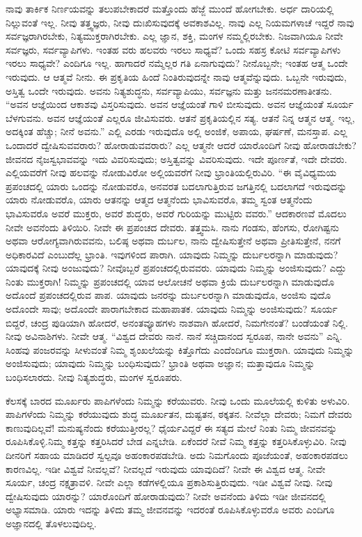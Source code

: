 ನಾವು ತಾರ್ಕಿಕ ನಿರ್ಣಯವನ್ನು ತಲುಪಬೇಕಾದರೆ ಮತ್ತೊಂದು ಹೆಜ್ಜೆ ಮುಂದೆ ಹೋಗಬೇಕು. ಅರ್ಧ ದಾರಿಯಲ್ಲಿ ನಿಲ್ಲುವಂತೆ ಇಲ್ಲ. ನೀವು ತತ್ತ್ವಜ್ಞರು, ನೀವು ದುಃಖಿಸುವುದಕ್ಕೆ ಅವಕಾಶವಿಲ್ಲ. ನಾವು ಎಲ್ಲ ನಿಯಮಗಳಾಚೆ ಇದ್ದರೆ ನಾವು ಸರ್ವಜ್ಞರಾಗಿರಬೇಕು, ನಿತ್ಯಮುಕ್ತರಾಗಿರಬೇಕು. ಎಲ್ಲ ಜ್ಞಾನ, ಶಕ್ತಿ, ಮಂಗಳ ನಮ್ಮಲ್ಲಿರಬೇಕು. ನಿಜವಾಗಿಯೂ ನೀವೇ ಸರ್ವಜ್ಞರು, ಸರ್ವವ್ಯಾಪಿಗಳು. ಇಂತಹ ವರು ಹಲವರು ಇರಲು ಸಾಧ್ಯವೆ? ಒಂದು ಸಹಸ್ರ ಕೋಟಿ ಸರ್ವವ್ಯಾಪಿಗಳು ಇರಲು ಸಾಧ್ಯವೇ? ಎಂದಿಗೂ ಇಲ್ಲ. ಹಾಗಾದರೆ ನಮ್ಮೆಲ್ಲರ ಗತಿ ಏನಾಗುವುದು? ನೀನೊಬ್ಬನೇ; ಇಂತಹ ಆತ್ಮ ಒಂದೇ ಇರುವುದು. ಆ ಆತ್ಮವೆ ನೀನು. ಈ ಪ್ರಕೃತಿಯ ಹಿಂದೆ ನಿಂತಿರುವುದನ್ನೇ ನಾವು ಆತ್ಮವೆನ್ನುವುದು. ಒಬ್ಬನೇ ಇರುವುದು, ಅಸ್ತಿತ್ವ ಒಂದೇ ಇರುವುದು. ಅವನು ನಿತ್ಯಶುದ್ಧನು, ಸರ್ವವ್ಯಾಪಿಯು, ಸರ್ವಜ್ಞನು ಮತ್ತು ಜನನಮರಣಾತೀತನು. “ಅವನ ಆಜ್ಞೆಯಿಂದ ಆಕಾಶವು ವಿಸ್ತರಿಸುವುದು. ಅವನ ಆಜ್ಞೆಯಂತೆ ಗಾಳಿ ಬೀಸುವುದು. ಅವನ ಆಜ್ಞೆಯಂತೆ ಸೂರ್ಯ ಬೆಳಗುವನು. ಅವನ ಆಜ್ಞೆಯಂತೆ ಎಲ್ಲರೂ ಜೀವಿಸುವರು. ಆತನೆ ಪ್ರಕೃತಿಯಲ್ಲಿನ ಸತ್ಯ. ಆತನೆ ನಿನ್ನ ಆತ್ಮನ ಆತ್ಮ. ಇಲ್ಲ, ಅದಕ್ಕಿಂತ ಹೆಚ್ಚು; ನೀನೆ ಅವನು.” ಎಲ್ಲಿ ಎರಡು ಇರುವುದೊ ಅಲ್ಲಿ ಅಂಜಿಕೆ, ಅಪಾಯ, ಘರ್ಷಣೆ, ಮನಸ್ತಾಪ. ಎಲ್ಲ ಒಂದಾದರೆ ದ್ವೇಷಿಸುವವರಾರು? ಹೋರಾಡುವವರಾರು? ಎಲ್ಲ ಆತ್ಮನೇ ಆದರೆ ಯಾರೊಂದಿಗೆ ನೀವು ಹೋರಾಡಬೇಕು? ಜೀವನದ ನೈಜಸ್ವಭಾವವನ್ನು ಇದು ವಿವರಿಸುವುದು; ಅಸ್ತಿತ್ವವನ್ನು ವಿವರಿಸುವುದು. ಇದೇ ಪೂರ್ಣತೆ, ಇದೇ ದೇವರು. ಎಲ್ಲಿಯವರೆಗೆ ನೀವು ಹಲವನ್ನು ನೋಡುವಿರೋ ಅಲ್ಲಿಯವರೆಗೆ ನೀವು ಭ್ರಾಂತಿಯಲ್ಲಿರುವಿರಿ. “ಈ ವೈವಿಧ್ಯಮಯ ಪ್ರಪಂಚದಲ್ಲಿ ಯಾರು ಒಂದನ್ನು ನೋಡುವರೊ, ಅನವರತ ಬದಲಾಗುತ್ತಿರುವ ಜಗತ್ತಿನಲ್ಲಿ ಬದಲಾಗದೆ ಇರುವುದನ್ನು ಯಾರು ನೋಡುವರೊ, ಯಾರು ಆತನನ್ನು ಆತ್ಮದ ಆತ್ಮನೆಂದು ಭಾವಿಸುವರೊ, ತಮ್ಮ ಸ್ವಂತ ಆತ್ಮನೆಂದು ಭಾವಿಸುವರೊ ಅವರೆ ಮುಕ್ತರು, ಅವರೆ ಶುದ್ಧರು, ಅವರೆ ಗುರಿಯನ್ನು ಮುಟ್ಟಿರು ವವರು.” ಆದಕಾರಣವೆ ಮೊದಲು ನೀವೇ ಅವನೆಂದು ತಿಳಿಯಿರಿ. ನೀವೇ ಈ ಪ್ರಪಂಚದ ದೇವರು. ತತ್ತ್ವಮಸಿ. ನಾನು ಗಂಡಸು, ಹೆಂಗಸು, ರೋಗಿಷ್ಟನು ಅಥವಾ ಆರೋಗ್ಯವಾಗಿರುವವನು, ಬಲಿಷ್ಠ ಅಥವಾ ದುರ್ಬಲ, ನಾನು ದ್ವೇಷಿಸುತ್ತೇನೆ ಅಥವಾ ಪ್ರೀತಿಸುತ್ತೇನೆ, ನನಗೆ ಅಧಿಕಾರವಿದೆ ಎಂಬುದೆಲ್ಲ ಭ್ರಾಂತಿ. ಇವುಗಳಿಂದ ಪಾರಾಗಿ. ಯಾವುದು ನಿಮ್ಮನ್ನು ದುರ್ಬಲರನ್ನಾಗಿ ಮಾಡುವುದು? ಯಾವುದಕ್ಕೆ ನೀವು ಅಂಜುವುದು? ನೀವೊಬ್ಬರೆ ಪ್ರಪಂಚದಲ್ಲಿರುವವರು. ಯಾವುದು ನಿಮ್ಮನ್ನು ಅಂಜಿಸುವುದು? ಎದ್ದು ನಿಂತು ಮುಕ್ತರಾಗಿ! ನಿಮ್ಮನ್ನು ಪ್ರಪಂಚದಲ್ಲಿ ಯಾವ ಆಲೋಚನೆ ಅಥವಾ ಕ್ರಿಯೆ ದುರ್ಬಲರನ್ನಾಗಿ ಮಾಡುವುದೊ ಅದೊಂದೆ ಪ್ರಪಂಚದಲ್ಲಿರುವ ಪಾಪ. ಯಾವುದು ಜನರನ್ನು ದುರ್ಬಲರನ್ನಾಗಿ ಮಾಡುವುದೊ, ಅಂಜಿಸು ವುದೊ ಅದೊಂದೇ ಸಾವು; ಅದೊಂದೇ ಪಾರಾಗಬೇಕಾದ ಮಹಾಪಾತಕ. ಯಾವುದು ನಿಮ್ಮನ್ನು ಅಂಜಿಸುವುದು? ಸೂರ್ಯ ಬಿದ್ದರೆ, ಚಂದ್ರ ಪುಡಿಯಾಗಿ ಹೋದರೆ, ಅನಂತವ್ಯೂಹಗಳು ನಾಶವಾಗಿ ಹೋದರೆ, ನಿಮಗೇನಂತೆ? ಬಂಡೆಯಂತೆ ನಿಲ್ಲಿ. ನೀವು ಅವಿನಾಶಿಗಳು. ನೀವೇ ಆತ್ಮ. “ವಿಶ್ವದ ದೇವರು ನಾನೆ. ನಾನೆ ಸಚ್ಚಿದಾನಂದ ಸ್ವರೂಪ, ನಾನೇ ಅವನು” ಎನ್ನಿ. ಸಿಂಹವು ಪಂಜರವನ್ನು ಸೀಳುವಂತೆ ನಿಮ್ಮ ಶೃಂಖಲೆಯನ್ನು ಕಿತ್ತೊಗೆದು ಎಂದೆಂದಿಗೂ ಮುಕ್ತರಾಗಿ. ಯಾವುದು ನಿಮ್ಮನ್ನು ಅಂಜಿಸುವುದು; ಯಾವುದು ನಿಮ್ಮನ್ನು ಬಂಧಿಸುವುದು? ಭ್ರಾಂತಿ ಅಥವಾ ಅಜ್ಞಾನ; ಮತ್ತಾವುದೂ ನಿಮ್ಮನ್ನು ಬಂಧಿಸಲಾರದು. ನೀವು ನಿತ್ಯಶುದ್ಧರು, ಮಂಗಳ ಸ್ವರೂಪರು.

ಕೆಲಸಕ್ಕೆ ಬಾರದ ಮೂರ್ಖರು ಪಾಪಿಗಳೆಂದು ನಿಮ್ಮನ್ನು ಕರೆಯುವರು. ನೀವು ಒಂದು ಮೂಲೆಯಲ್ಲಿ ಕುಳಿತು ಅಳುವಿರಿ. ಪಾಪಿಗಳೆಂದು ನಿಮ್ಮನ್ನು ಕರೆಯುವುದು ಶುದ್ಧ ಮೂರ್ಖತನ, ದುಷ್ಟತನ, ಠಕ್ಕತನ. ನೀವೆಲ್ಲಾ ದೇವರು; ನಿಮಗೆ ದೇವರು ಕಾಣುವುದಿಲ್ಲವೆ! ಮನುಷ್ಯನೆಂದು ಕರೆಯುತ್ತೀರಲ್ಲ? ಧೈರ್ಯವಿದ್ದರೆ ಈ ಸತ್ಯದ ಮೇಲೆ ನಿಂತು ನಿಮ್ಮ ಜೀವನವನ್ನು ರೂಪಿಸಿಕೊಳ್ಳಿ.ನಿಮ್ಮ ಕತ್ತನ್ನು ಕತ್ತರಿಸಿದರೆ ಬೇಡ ಎನ್ನಬೇಡಿ. ಏಕೆಂದರೆ ನೀವೆ ನಿಮ್ಮ ಕತ್ತನ್ನು ಕತ್ತರಿಸಿಕೊಳ್ಳುವಿರಿ. ನೀವು ದೀನರಿಗೆ ಸಹಾಯ ಮಾಡಿದರೆ ಸ್ವಲ್ಪವೂ ಅಹಂಕಾರಪಡಬೇಡಿ. ಅದು ನಿಮಗೊಂದು ಪೂಜೆಯಂತೆ, ಅಹಂಕಾರಪಡಲು ಕಾರಣವಿಲ್ಲ. ಇಡೀ ವಿಶ್ವವೆ ನೀವಲ್ಲವೆ? ನೀವಲ್ಲದೆ ಇರುವುದು ಯಾವುದಿದೆ? ನೀವೇ ಈ ವಿಶ್ವದ ಆತ್ಮ. ನೀವೇ ಸೂರ್ಯ, ಚಂದ್ರ ನಕ್ಷತ್ರಾವಳಿ. ನೀವೇ ಎಲ್ಲಾ ಕಡೆಗಳಲ್ಲಿಯೂ ಪ್ರಕಾಶಿಸುತ್ತಿರುವುದು. ಇಡೀ ವಿಶ್ವವೆ ನೀವು. ನೀವು ದ್ವೇಷಿಸುವುದು ಯಾರನ್ನು? ಯಾರೊಂದಿಗೆ ಹೋರಾಡುವುದು? ನೀವೇ ಅವನೆಂದು ತಿಳಿದು ಇಡೀ ಜೀವನದಲ್ಲಿ ಅಭ್ಯಾಸಮಾಡಿ. ಯಾರು ಇದನ್ನು ತಿಳಿದು ತಮ್ಮ ಜೀವನವನ್ನು ಇದರಂತೆ ರೂಪಿಸಿಕೊಳ್ಳುವರೊ ಅವರು ಎಂದಿಗೂ ಅಜ್ಞಾನದಲ್ಲಿ ತೊಳಲುವುದಿಲ್ಲ.

